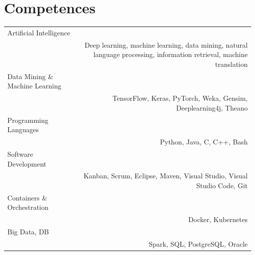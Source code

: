 \documentclass[10pt]{article}
\begin{document}
\section*{Competences}
\begin{tabular}{L!{\VRule}R}
Artificial Intelligence\\&Deep learning, machine learning, data mining, natural language processing, information retrieval, machine translation\\
Data Mining \& Machine Learning\\&TensorFlow, Keras, PyTorch, Weka, Gensim, Deeplearning4j, Theano\\
Programming Languages\\&Python, Java, C, C++, Bash\\
Software Development\\&Kanban, Scrum, Eclipse, Maven, Visual Studio, Visual Studio Code, Git\\
Containers \& Orchestration\\ & Docker, Kubernetes\\
Big Data, DB\\& Spark, SQL, PostgreSQL, Oracle\\
\end{tabular}
\end{document}
